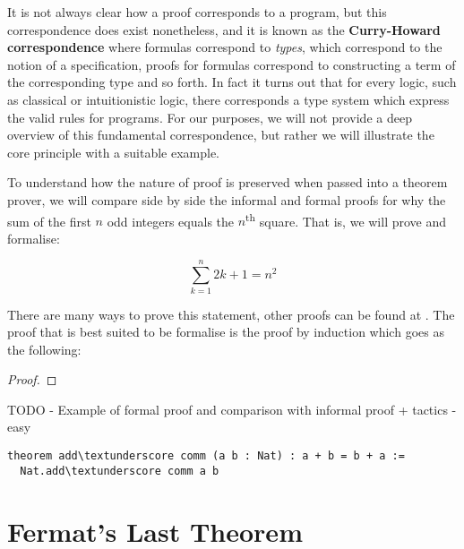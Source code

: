 It is not always clear how a proof corresponds to a program, but this correspondence does exist nonetheless, and it is known as the \textbf{Curry-Howard correspondence} where formulas correspond to \textit{types}, which correspond to the notion of a specification, 
proofs for formulas correspond to constructing a term of the corresponding type and so forth. In fact it turns out that for every logic, such as classical or intuitionistic logic, there corresponds a type system which express the valid rules for programs. 
For our purposes, we will not provide a deep overview of this fundamental correspondence, but rather we will illustrate the core principle with a suitable example.

\begin{example}
    To understand how the nature of proof is preserved when passed into a theorem prover, we will compare side by side the informal and formal proofs 
    for why the sum of the first $n$ odd integers equals the $n$\textsuperscript{th} square. That is, we will prove and formalise:

    \begin{equation*}
        \sum_{k = 1}^{n} 2k + 1 = n^2
    \end{equation*}

    There are many ways to prove this statement, other proofs can be found at \cite{sangwin}. The proof that is best suited to be formalise is the
    proof by induction which goes as the following:

    \begin{proof}
        
    \end{proof}



    

\end{example}






TODO - Example of formal proof and comparison with informal proof + tactics - easy


\begin{verbatim}
theorem add\textunderscore comm (a b : Nat) : a + b = b + a :=
  Nat.add\textunderscore comm a b
\end{verbatim}


\section{Fermat's Last Theorem}


